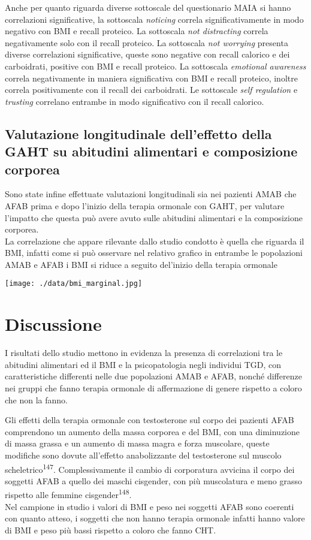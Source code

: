 \documentclass[12pt]{article}
\makeatletter
\newcommand{\cslcitation}[2]
 {\protect\hyper@linkstart{cite}{citeproc_bib_item_#1}#2\hyper@linkend}
\makeatother
\begin{document}
Anche per quanto riguarda diverse sottoscale del questionario MAIA si hanno correlazioni significative, la sottoscala \emph{noticing} correla significativamente in modo negativo con BMI e recall proteico. La sottoscala \emph{not distracting} correla negativamente solo con il recall proteico. La sottoscala \emph{not worrying} presenta diverse correlazioni significative, queste sono negative con recall calorico e dei carboidrati, positive con BMI e recall proteico. La sottoscala \emph{emotional awareness} correla negativamente in maniera significativa con BMI e recall proteico, inoltre correla positivamente con il recall dei carboidrati. Le sottoscale \emph{self regulation} e \emph{trusting} correlano entrambe in modo significativo con il recall calorico.
\subsection{Valutazione longitudinale dell'effetto della GAHT su abitudini alimentari e composizione corporea}
\label{sec:org96be358}

Sono state infine effettuate valutazioni longitudinali sia nei pazienti AMAB che AFAB prima e dopo l’inizio della terapia ormonale con GAHT, per valutare l’impatto che questa può avere avuto sulle abitudini alimentari e la composizione corporea. \\
La correlazione che appare rilevante dallo studio condotto è quella che riguarda il BMI, infatti come si può osservare nel relativo grafico in entrambe le popolazioni AMAB e AFAB i BMI si riduce a seguito del’inizio della terapia ormonale

\begin{center}
\texttt{[image: ./data/bmi\_marginal.jpg]}
\end{center}
\section{Discussione}
\label{sec:org6300973}
I risultati dello studio mettono in evidenza la presenza di correlazioni tra le abitudini alimentari ed il BMI e la psicopatologia negli individui TGD, con caratteristiche differenti nelle due popolazioni AMAB e AFAB, nonché differenze nei gruppi che fanno terapia ormonale di affermazione di genere rispetto a coloro che non la fanno.

Gli effetti della terapia ormonale con testosterone sul corpo dei pazienti AFAB comprendono un aumento della massa corporea e del BMI, con una diminuzione di massa grassa e un aumento di massa magra e forza muscolare, queste modifiche sono dovute all'effetto anabolizzante del testosterone sul muscolo scheletrico\textsuperscript{\cslcitation{147}{147}}. Complessivamente il cambio di corporatura avvicina il corpo dei soggetti AFAB a quello dei maschi cisgender, con più muscolatura e meno grasso rispetto alle femmine cisgender\textsuperscript{\cslcitation{148}{148}}. \\
Nel campione in studio i valori di BMI e peso nei soggetti AFAB sono coerenti con quanto atteso, i soggetti che non hanno terapia ormonale infatti hanno valore di BMI e peso più bassi rispetto a coloro che fanno CHT.
\end{document}
